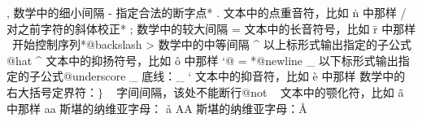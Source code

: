 \capcs , {数学中的细小间隔}{}{\@comma}
\capcs - {指定合法的断字点}*{\@minus}
\capcs . {文本中的点重音符，比如 \.n 中那样}{}{\@dot}
\capcs / {对之前字符的斜体校正}*{\@slash}
\capcs ; {数学中的较大间隔}{}{\@semi}
\capcs = {文本中的长音符号，比如 \=r 中那样}{}{\@equal}
\capac \ {开始控制序列}*{@backslash}
\capcs > {数学中的中等间隔}{}{\@greater}
\capac ^ {以上标形式输出指定的子公式}{}{@hat}
\capcs ^ {文本中的抑扬符号，比如 \^o 中那样}{}{\@hat}
{\catcode `@ = 
*{@newline}
}%
\capac _ {以下标形式输出指定的子公式}{}{@underscore}
\capcs _ {底线：\_}{}{\@underscore}
\capcs ` {文本中的抑音符，比如 \`e 中那样}{}{\@lquote}
\capac { {开始编组}{}{@lbrace}
\capcs { {数学中的左大括号定界符：$\{$}{}{\@lbrace}
\capcs | {数学中的平行线：$\Vert$}{}{\@bar}
\capac } {结束编组}{}{@rbrace}
\capcs } {数学中的右大括号定界符：$\}$}{}{\@rbrace}
\capac ~ {字间间隔，该处不能断行}{}{@not}
\capcs ~ {文本中的颚化符，比如 \~a 中那样}{}{\@not}
\writeidxtrue
{}%
\capcs aa {斯堪的纳维亚字母： \aa}{}{}
\capcs AA {斯堪的纳维亚字母：\AA}{}{}
